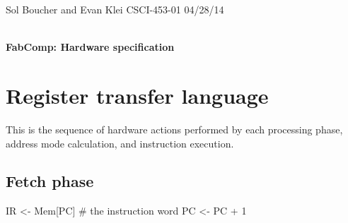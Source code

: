 \documentclass[12pt]{article}
\begin{document}
\setlength{\parindent}{0pt}

\begin{framed}
Sol Boucher and Evan Klei \hfill CSCI-453-01 \hfill 04/28/14 \\
\vspace{6pt} \\
\centerline{\textbf{\huge FabComp: Hardware specification}}
\end{framed}

\section{Register transfer language}
This is the sequence of hardware actions performed by each processing phase, address mode calculation, and instruction execution.

\subsection{Fetch phase}
\begin{verbatimtab}
IR <- Mem[PC] # the instruction word
PC <- PC + 1
\end{verbatimtab}
\end{document}
